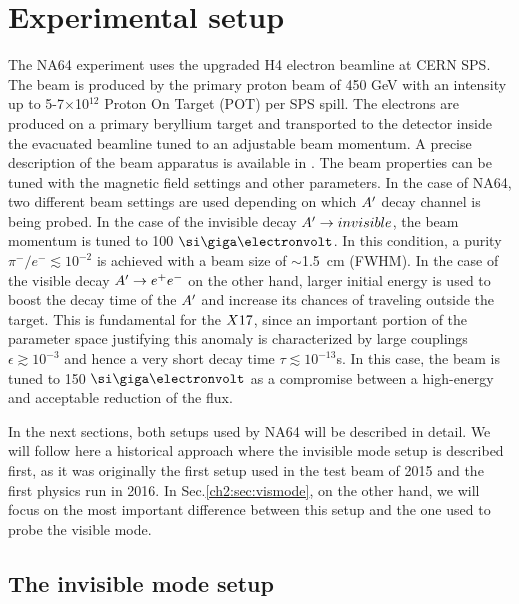 \clearpage
\newpage

\section{Experimental setup}
\label{ch2:sec:experimental-setup}

The NA64 experiment uses the upgraded H4 electron beamline at CERN SPS. The beam is produced by the primary proton beam of 450 \si{\giga\electronvolt} with an intensity up to 5-7$\times$10$^{12}$ Proton On Target (POT) per SPS spill. The electrons are produced on a primary beryllium target and transported to the detector inside the evacuated beamline tuned to an adjustable beam momentum. A precise description of the beam apparatus is available in \cite{sps-beamline,h4-beamline}. The beam properties can be tuned with the magnetic field settings and other parameters. In the case of NA64, two different beam settings are used depending on which $A'$ decay channel is being probed. In the case of the invisible decay $A'\to invisible$, the beam momentum is tuned to 100 $\gev$. In this condition, a purity $\pi^-/e^- \lesssim 10^{-2}$ is achieved with a beam size of $\sim$\SI{1.5}{cm} (FWHM). In the case of the visible decay $A' \to e^+e^-$ on the other hand, larger initial energy is used to boost the decay time of the $A'$ and increase its chances of traveling outside the target. This is fundamental for the $X17$, since an important portion of the parameter space justifying this anomaly is characterized by large couplings $\epsilon \gtrsim 10^{-3}$ and hence a very short decay time $\tau \lesssim 10^{-13}$\si{s}. In this case, the beam is tuned to 150 $\gev$ as a compromise between a high-energy and acceptable reduction of the flux.

In the next sections, both setups used by NA64 will be described in detail. We will follow here a historical approach where the invisible mode setup is described first, as it was originally the first setup used in the test beam of 2015 and the first physics run in 2016. In Sec.\ref{ch2:sec:vismode}, on the other hand, we will focus on the most important difference between this setup and the one used to probe the visible mode.

\subsection{The invisible mode setup}
\label{ch2:sec:invismode}

